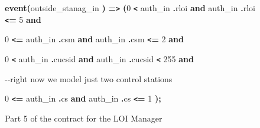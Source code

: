 \begin{figure}
{{{\color{color18} \textbf{event(}}outside\_stanag\_in{\color{color18} \textbf{)}} 
{\color{color18} \textbf{=\texttt{>}     }}
\parindent=12pt
{\color{color18} \textbf{(}}0 {\color{color18} \textbf{\texttt{<}}} auth\_in{\color{color18} \textbf{.}}rloi 
{\color{color18} \textbf{and}} auth\_in{\color{color18} \textbf{.}}rloi {\color{color18} \textbf{\texttt{<}=}} 
5 {\color{color18} \textbf{and     }}

\parindent=18pt
0 {\color{color18} \textbf{\texttt{<}=}} auth\_in{\color{color18} \textbf{.}}csm 
{\color{color18} \textbf{and}} auth\_in{\color{color18} \textbf{.}}csm {\color{color18} \textbf{\texttt{<}=}} 
2 {\color{color18} \textbf{and}}      

0 {\color{color18} \textbf{\texttt{<}}} auth\_in{\color{color18} \textbf{.}}cucsid 
{\color{color18} \textbf{and}} auth\_in{\color{color18} \textbf{.}}cucsid {\color{color18} \textbf{\texttt{<}}} 
255 {\color{color18} \textbf{and     }}

\parindent=0pt
{\color{color17} -{}-right now we model just two control stations      }

\parindent=18pt
0 {\color{color18} \textbf{\texttt{<}=}} auth\_in{\color{color18} \textbf{.}}cs 
{\color{color18} \textbf{and}} auth\_in{\color{color18} \textbf{.}}cs {\color{color18} \textbf{\texttt{<}=}} 
1{\color{color18} \textbf{);}}

}%
}
\caption{Part 5 of the contract for the LOI Manager}
\label{fig:loi-contract5}
\end{figure}